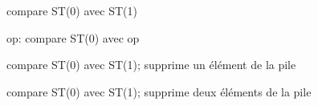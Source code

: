  \item[FCOM] compare ST(0) avec ST(1)
  \item[FCOM] op: compare ST(0) avec op
  \item[FCOMP] compare ST(0) avec ST(1); supprime un élément de la pile
  \item[FCOMPP] compare ST(0) avec ST(1); supprime deux éléments de la pile

